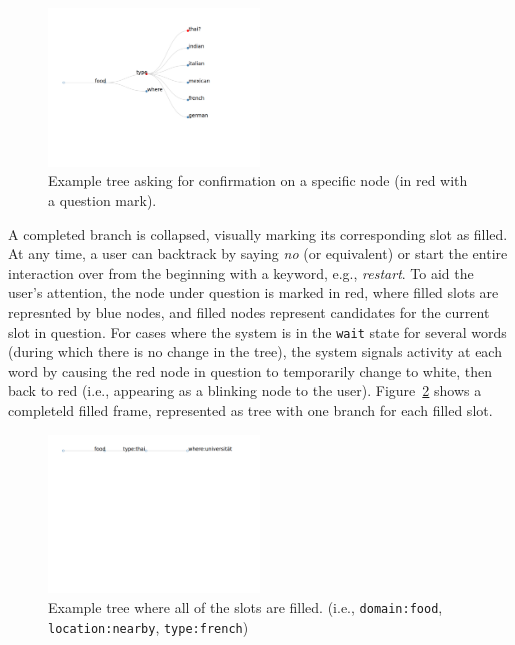 \documentclass[11pt]{article}
\begin{document}
\begin{figure}[ht]
  \centering
      \includegraphics[width=0.5\textwidth]{figures/diatree-confirmation.pdf}	
      \caption{Example tree asking for confirmation on a specific node (in red with a question mark).\label{fig:confirm}}
\end{figure}

A completed branch is collapsed, visually marking its corresponding slot as filled. At any time, a user can backtrack by saying \emph{no} (or equivalent) or start the entire interaction over from the beginning with a keyword, e.g., \emph{restart}. To aid the user's attention, the node under question is marked in red, where filled slots are represnted by blue nodes, and filled nodes represent candidates for the current slot in question. For cases where the system is in the \texttt{wait} state for several words (during which there is no change in the tree), the system signals activity at each word by causing the red node in question to temporarily change to white, then back to red (i.e., appearing as a blinking node to the user). Figure~\ref{fig:filled} shows a completeld filled frame, represented as tree with one branch for each filled slot.

\begin{figure}[ht]
  \centering
      \includegraphics[width=0.5\textwidth]{figures/diatree-filled.pdf}	
      \caption{Example tree where all of the slots are filled. (i.e., \texttt{domain:food}, \texttt{location:nearby}, \texttt{type:french}) \label{fig:filled}}
\end{figure}
\end{document}
